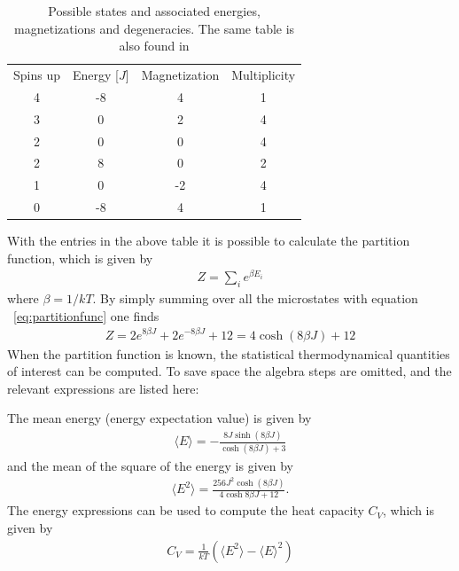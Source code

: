 \documentclass[aps,reprint]{revtex4-1}
\newcommand{\mean}[1]{\langle #1 \rangle}
\begin{document}
\begin{table}[H]
  \caption{Possible states and associated energies, magnetizations and degeneracies.
  The same table is also found in \cite{mortenjensen}}
  \label{tab:2x2values}
  \begin{ruledtabular}
    \begin{tabular}{cccc}
      Spins up & Energy [$J$] & Magnetization & Multiplicity \\
      4        & -8           & 4             & 1            \\
      3        & 0            & 2             & 4            \\
      2        & 0            & 0             & 4            \\
      2        & 8            & 0             & 2            \\
      1        & 0            & -2            & 4            \\
      0        & -8           & 4             & 1
    \end{tabular}
  \end{ruledtabular}
\end{table}
With the entries in the above table it is possible to calculate the partition
function, which is given by
\begin{align} \label{eq:partitionfunc}
  Z = \sum_i e^{\beta E_i}
\end{align}
where $\beta = 1/kT$. By simply summing over all the microstates with equation ~\ref{eq:partitionfunc}
one finds
\begin{align*}
  Z = 2 e^{8\beta J} + 2 e^{- 8\beta J} + 12 = 4 \cosh{(8\beta J)} + 12
\end{align*}
When the partition function is known, the statistical thermodynamical quantities
of interest can be computed. To save space the algebra steps are omitted,
and the relevant expressions are listed here:

The mean energy (energy expectation value) is given by
\begin{align*}
  \mean{E} = -\frac{8 J \sinh{(8\beta J)}}{\cosh{(8\beta J)} + 3}
\end{align*}
and the mean of the square of the energy is given by
\begin{align*}
  \mean{E^2} = \frac{256 J^2 \cosh{(8\beta J)}}{4\cosh{8\beta J} + 12}.
\end{align*}
The energy expressions can be used to compute the heat capacity $C_V$, which
is given by
\begin{align*}
  C_V = \frac{1}{kT} \left( \mean{E^2} - \mean{E}^2 \right)
\end{align*}
\end{document}

